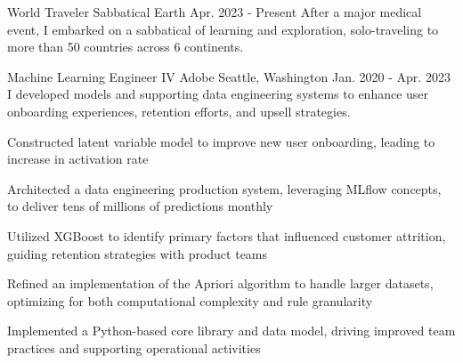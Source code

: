 

\begin{cventries}

\cventry
    {World Traveler} %
    {Sabbatical} %
    {Earth} %
    {Apr. 2023 - Present} %
    {After a major medical event, I embarked on a sabbatical of learning and exploration, solo-traveling to more than 50 countries across 6 continents.} %
    {}

\cventry
    {Machine Learning Engineer IV} %
    {Adobe} %
    {Seattle, Washington} %
    {Jan. 2020 - Apr. 2023} %
    {I developed models and supporting data engineering systems to enhance user onboarding experiences, retention efforts, and upsell strategies.} %
    {
      \begin{cvitems} %
        \item {Constructed latent variable model to improve new user onboarding, leading to increase in activation rate}
        \item {Architected a data engineering production system, leveraging MLflow concepts, to deliver tens of millions of predictions monthly}
        \item {Utilized XGBoost to identify primary factors that influenced customer attrition, guiding retention strategies with product teams}
        \item {Refined an implementation of the Apriori algorithm to handle larger datasets, optimizing for both computational complexity and rule granularity}
        \item {Implemented a Python-based core library and data model, driving improved team practices and supporting operational activities}
      \end{cvitems}
    }


\end{cventries}
